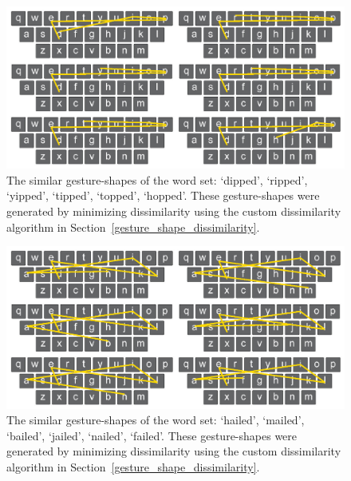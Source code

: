 \clearpage

\begin{figure}[t]
	\centering
	\includegraphics[width=5in]{Figures/fig_words_14}
	\caption[Word Set 14]{The similar gesture-shapes of the word set: `dipped', `ripped', `yipped', `tipped', `topped', `hopped'. These gesture-shapes were generated by minimizing dissimilarity using the custom dissimilarity algorithm in Section~\ref{gesture_shape_dissimilarity}.}
	\label{fig_words_14}
\end{figure}

\begin{figure}[b]
	\centering
	\includegraphics[width=5in]{Figures/fig_words_15}
	\caption[Word Set 15]{The similar gesture-shapes of the word set: `hailed', `mailed', `bailed', `jailed', `nailed', `failed'. These gesture-shapes were generated by minimizing dissimilarity using the custom dissimilarity algorithm in Section~\ref{gesture_shape_dissimilarity}.}
	\label{fig_words_15}
\end{figure}